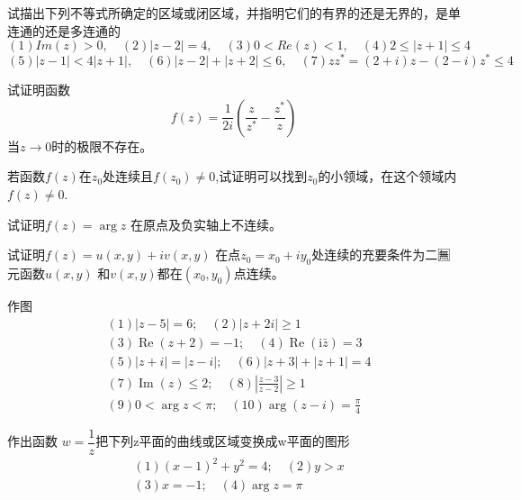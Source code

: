 \begin{Exercises}
    \item 试描出下列不等式所确定的区域或闭区域，并指明它们的有界的还是无界的，是单连通的还是多连通的
    \[(1) Im(z)> 0, \quad (2) |z-2| =4, \quad (3) 0< Re(z) <1, \quad (4) 2\le |z+1|\le 4\]
    \[(5) |z-1| < 4|z+1|, \quad (6) |z-2| + |z+2| \le 6, \quad (7) zz^* =(2+i) z -(2-i)z^* \le 4 \]
    \item 试证明函数 
    \[ f(z) = \frac{1}{2i} \left( \frac{z}{z^*} -\frac{z^*}{z} \right) \]
    当$z \to 0$时的极限不存在。
    \item 若函数$f(z)$在$z_0$处连续且$f(z_0) \ne 0$,试证明可以找到$z_0$的小领域，在这个领域内$f(z) \ne 0$.
    \item 试证明$f(z) = \arg z$ 在原点及负实轴上不连续。
    \item 试证明$f(z) = u(x,y) + i v(x,y)$ 在点$z_0 = x_0 + i y_0$处连续的充要条件为二🈚元函数$u(x,y)$ 和$v(x,y)$都在$(x_0, y_0)$点连续。
    \item 作图 
    \[ \begin{aligned}
        &(1)  |z-5|=6 ;\quad 
        (2)  |z+2 i| \geqslant 1 \\
        &(3)  \operatorname{Re}(z+2)=-1 ;\quad 
        (4)  \operatorname{Re}(\mathrm{i} \bar{z})=3 \\
        &(5)  |z+i|=|z-i| ;\quad 
        (6)  |z+3|+|z+1|=4 \\
        &(7)  \operatorname{Im}(z) \leqslant 2 ;\quad 
        (8)  \left|\frac{z-3}{z-2}\right| \geqslant 1 \\
        &(9)  0<\arg z<\pi ;\quad 
        (10)  \arg (z-i)=\frac{\pi}{4}  
    \end{aligned}\]
    \item 作出函数 $w = \dfrac{1}{z}$把下列z平面的曲线或区域变换成w平面的图形
    \[ \begin{aligned}
        &(1) (x-1)^2 +y^2 =4 ;\quad 
        (2)  y > x\\
        &(3)  x=-1 ;\quad 
        (4)   \arg z =\pi 
    \end{aligned}\]
\end{Exercises} 

